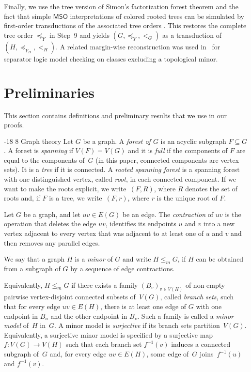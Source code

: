 \documentclass[1p,number,11pt]{elsarticle}
\makeatletter
\renewcommand\subsection{\@startsection{subsection}{2}{\z@}%
  {-18\p@ \@plus -4\p@ \@minus -4\p@}%
  {8\p@ \@plus 4\p@ \@minus 4\p@}%
  {\normalfont\normalsize\bfseries}}
\theoremstyle{plain}
\newcommand{\MSO}{\ensuremath{\mathsf{MSO}}}
\renewcommand{\leq}{\leqslant}
\makeatother
\begin{document}
Finally, we use the tree version of Simon's factorization forest theorem and
the fact that simple $\MSO$ interpretations of colored rooted trees can be
simulated by first-order transductions of the associated tree orders
\cite{Colcombet2007}. This restores the complete tree order $\preceq_Y$ in
Step~9 and yields $(G,\preceq_Y,<_G)$ as a transduction of~$(H,\preceq_{Y_H},<_H)$. A related
margin-wise reconstruction was used in~\cite{schirrmacher2023first} for
separator logic model checking on classes excluding a topological minor.

\section{Preliminaries}

This section contains definitions and preliminary results that we use in our proofs.

\subsection{Graph theory}
Let $G$ be a graph.
A \emph{forest of $G$} is an acyclic subgraph $F\subseteq G$.
A forest is \emph{spanning} if $V(F)=V(G)$ and it is \emph{full} if the components of $F$ are equal to the components of~$G$ (in this paper, connected components are vertex sets). 
It is a \emph{tree} if it is connected. 
A \emph{rooted spanning forest} is a spanning forest with one distinguished vertex, called \emph{root}, in each connected component. 
If we want to make the roots explicit, we write~$(F,R)$, where $R$ denotes the set of roots and, if $F$ is a tree, we write~$(F,r)$, where $r$ is the unique root of $F$. 


Let $G$ be a graph, and let $uv\in E(G)$ be an edge.
The \emph{contraction} of $uv$ is the operation that deletes the edge $uv$, identifies its endpoints $u$ and $v$ into a new vertex adjacent to every vertex that was adjacent to at least one of $u$ and $v$ and then removes any parallel edges.

We say that a graph $H$ is a \emph{minor} of $G$ and write
$H \leq_m G$,
if $H$ can be obtained from a subgraph of $G$ by a sequence of edge contractions.

Equivalently, $H \leq_m G$ if there exists a family $(B_v)_{v\in V(H)}$ of non-empty pairwise vertex-disjoint connected subsets of~$V(G)$, called \emph{branch sets}, such that for every edge $uv\in E(H)$, there is at least one edge of $G$ with one endpoint in $B_u$ and the other endpoint in $B_v$.
Such a family is called a \emph{minor model} of~$H$ in~$G$.
A minor model is \emph{surjective} if its branch sets partition~$V(G)$.
Equivalently, a surjective minor model is specified by a surjective map $f\colon V(G)\to V(H)$ such that each branch set $f^{-1}(v)$ induces a connected subgraph of~$G$ and, for every edge $uv\in E(H)$, some edge of~$G$ joins~$f^{-1}(u)$ and $f^{-1}(v)$.
\end{document}
